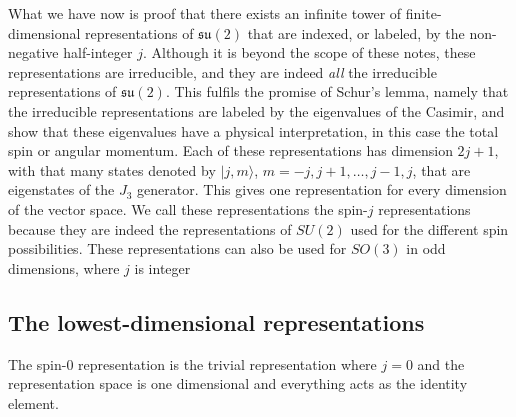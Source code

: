 \documentclass[notes.tex]{subfiles}
\begin{document}
What we have now is proof that there exists an infinite tower of finite-dimensional representations of $\mathfrak{su}(2)$ that are indexed, or labeled, by the non-negative half-integer $j$. Although it is beyond the scope of these notes, these representations are irreducible, and they are indeed {\it all} the irreducible representations of $\mathfrak{su}(2)$. This fulfils the promise of Schur's lemma, namely that the irreducible representations are labeled by the eigenvalues of the Casimir, and show that these eigenvalues have a physical interpretation, in this case the total spin or angular momentum. Each of these representations has dimension $2j+1$, with that many states denoted by $|j,m\rangle$, $m=-j,j+1,\ldots,j-1,j$, that are eigenstates of the $J_3$ generator. This gives one representation for every dimension of the vector space. We call these representations the spin-$j$ representations because they are indeed the representations of $SU(2)$ used for the different spin possibilities.
These representations can also be used for $SO(3)$ in odd dimensions, where $j$ is integer


\subsection{The lowest-dimensional representations}
\label{sec:SU2_irreps}
The spin-0 representation is the trivial representation where $j=0$ and the representation space is one dimensional and everything acts as the identity element. 
\end{document}
